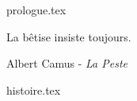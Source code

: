 \documentclass[11pt, a4paper, french]{article}
\begin{document}
    \maketitle
    {prologue.tex}
    \pagebreak

    \epigraph{La bêtise insiste toujours.}{Albert Camus - \textit{La Peste}}\bigskip

    {histoire.tex}
   
\end{document}
